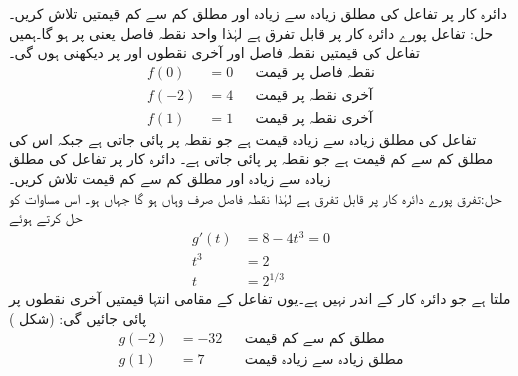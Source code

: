 دائرہ کار  پر تفاعل  کی مطلق زیادہ سے زیادہ اور مطلق کم سے کم قیمتیں تلاش کریں۔\\
حل:\quad
تفاعل پورے دائرہ کار پر قابل تفرق ہے لہٰذا واحد نقطہ فاصل  یعنی  پر ہو گا۔ہمیں تفاعل کی قیمتیں نقطہ فاصل  اور آخری نقطوں  اور  پر دیکھنی ہوں گی۔
\begin{align*}
f(0)&=0&&\text{نقطہ فاصل پر قیمت}\\
f(-2)&=4&&\text{آخری نقطہ پر قیمت}\\
f(1)&=1&&\text{آخری نقطہ پر قیمت}
\end{align*}
تفاعل کی مطلق زیادہ سے زیادہ قیمت  ہے جو نقطہ  پر پائی جاتی ہے جبکہ اس کی مطلق کم سے کم قیمت  ہے جو نقطہ  پر پائی جاتی ہے۔
دائرہ کار  پر تفاعل  کی مطلق زیادہ سے زیادہ اور مطلق کم سے کم قیمت تلاش کریں۔\\
حل:\quad تفرق پورے دائرہ کار پر قابل تفرق ہے لہٰذا نقطہ فاصل صرف وہاں ہو گا جہاں  ہو۔ اس مساوات کو حل کرتے ہوئے
\begin{align*}
g'(t)&=8-4t^3=0\\
t^3&=2\\
t&=2^{1/3}
\end{align*}
ملتا ہے جو دائرہ کار کے اندر نہیں ہے۔یوں تفاعل کے مقامی انتہا قیمتیں آخری نقطوں پر پائی جائیں گی: (شکل )
\begin{align*}
g(-2)&=-32&&\text{مطلق کم سے کم قیمت}\\
g(1)&=7&&\text{مطلق زیادہ سے زیادہ قیمت}
\end{align*}
%
